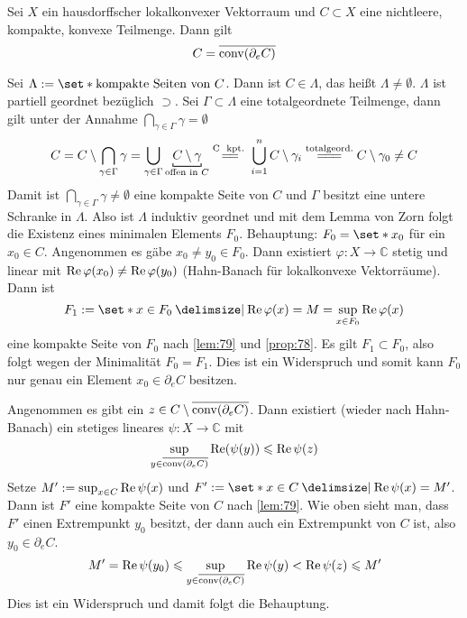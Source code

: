 \begin{satz}[{name={Krein-Milman}},label=satz:krein_milman]
	Sei $X$ ein hausdorffscher lokalkonvexer Vektorraum und $C \subset X$ eine nichtleere, kompakte, konvexe Teilmenge.
	Dann gilt 
	\[
		C=\overline{\operatorname{conv}(\partial_e C)}
	\]
\end{satz}
\begin{beweis}
	Sei $\Lambda := \set*{\text{kompakte Seiten von }C}$.
	Dann ist $C \in \Lambda$, das heißt $\Lambda \neq \emptyset$.
	$\Lambda$ ist partiell geordnet bezüglich $\supset$.
	Sei $\Gamma \subset \Lambda$ eine totalgeordnete Teilmenge, dann gilt unter der Annahme $\bigcap_{\gamma \in \Gamma} \gamma =\emptyset$
	\[
		C= C \setminus \bigcap_{\gamma \in \Gamma} \gamma = \bigcup_{\gamma \in \Gamma} \Underbracket{C \setminus \gamma}{\text{offen in }C}\StackText{C \text{ kpt.} }{=\joinrel=} 
		\bigcup_{i=1}^n C \setminus \gamma_i \StackText{totalgeord.}{=\joinrel=\joinrel=} C \setminus \gamma_0 \neq C
	\]
	Damit ist $\bigcap_{\gamma \in \Gamma} \gamma \neq \emptyset$ eine kompakte Seite von $C$ und $\Gamma$ besitzt eine untere Schranke in $\Lambda$.
	Also ist $\Lambda$ induktiv geordnet und mit dem Lemma von Zorn folgt die Existenz eines minimalen Elements $F_0$.
	Behauptung: $F_0= \set*{x_0}$ für ein $x_0 \in C$.
	Angenommen es gäbe $x_0 \neq y_0 \in F_0$. 
	Dann existiert $\varphi \colon X \to \mathbb{C}$ stetig und linear mit $\operatorname{Re} \varphi(x_0) \neq \operatorname{Re} \varphi(y_0)$ (Hahn-Banach für lokalkonvexe Vektorräume).
	Dann ist 
	\[
		F_1 :=  \set*{x \in F_0 \given \re \varphi(x)=M=\sup_{x \in F_0} \re \varphi(x)}
	\]
	eine kompakte Seite von $F_0$ nach \autoref{lem:79} und \autoref{prop:78}.
	Es gilt $F_1 \subset F_0$, also folgt wegen der Minimalität $F_0=F_1$.
	Dies ist ein Widerspruch und somit kann $F_0$ nur genau ein Element $x_0 \in \partial_e C$ besitzen.
	
	Angenommen es gibt ein $z \in C \setminus \overline{\operatorname{conv}(\partial_e C)}$.
	Dann existiert (wieder nach Hahn-Banach) ein stetiges lineares $\psi \colon X \to \mathbb{C}$ mit 
	\[
		\sup_{y \in \overline{\conv(\partial_e C)}} \re \enbrace*{\psi(y)} \le \re \psi(z)
	\]
	Setze $M' := \sup_{x \in C} \operatorname{Re} \psi(x)$ und $F':= \set*{x \in C \given \re \psi(x) =M'}$.
	Dann ist $F'$ eine kompakte Seite von $C$ nach \autoref{lem:79}.
	Wie oben sieht man, dass $F'$ einen Extrempunkt $y_0$ besitzt, der dann auch ein Extrempunkt von $C$ ist, also $y_0 \in \partial_e C$.
	\[
		M' = \operatorname{Re} \psi(y_0) \leqslant \sup_{y \in \overline{\operatorname{conv}(\partial_e C)}} \operatorname{Re} \psi(y) < \operatorname{Re} \psi(z) \leqslant M'
	\]
	Dies ist ein Widerspruch und damit folgt die Behauptung.
\end{beweis}

